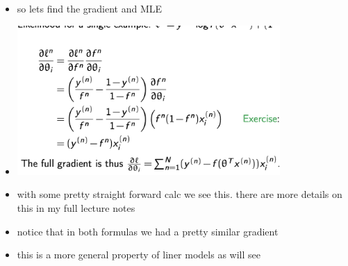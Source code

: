 \documentclass{article}
\begin{document}
\begin{itemize}
\begin{itemize}
    \item this can be expressed as $log(P(y=1|x))-log(p(y=0|x)$
    \item recall that we can write $P(y|x)=P(y|x)=h(x)^y(1-h(x))^{1-y}$ 
    \item so thus we have $ log(\frac{P(y=1|x)}{P(y=0|x)})=\theta^Tx=log(P(y=1|x))-log(p(y=0|x)=log(f(x)^1(1-h(x))^{1-1})-log(f(x)^(0)(1-h(x))^{1-0})=log(f(x))-log(1-f(x))=log(\frac{1}{1+e^{-\eta}})-log(1-\frac{1}{1+e^{-\eta}})=log(1)-log(1+e^{-\eta})-log(\frac{1+\eta^-n-1}{1+\eta^-n}=log(1+e^{-\eta})-log(\frac{e^-\eta}{1+e^{-\eta}}=log(1+e^{-\eta})-log(e^{-\eta})+log(1+e^{-\eta})=-log(e^{-\eta})=\eta=\theta^tx$
    \item so in other words the log odds are a linear function that form a decision boundary, that is a linear decision boundary
    \item this means the decision boundary is linear, ie the features are linear in the parameter as we increase the value of $\theta^tx$ we get 1, and as we decrees it we get zero
    
\end{itemize}
\item so lets find the gradient and MLE 
\item \includegraphics*[width=10cm]{images/Screenshot 2023-05-13 at 6.06.09 PM.png}
\item with some pretty straight forward calc we see this. there are more details on this in my full lecture notes 
\item notice that in both formulas we had a pretty similar gradient 
\item this is a more general property of liner models as will see

\end{itemize}
\end{document}
